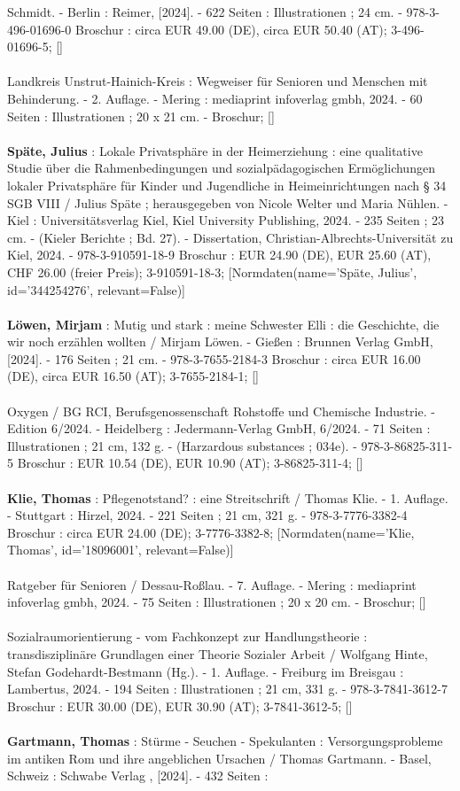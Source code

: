 \documentclass{article}
\begin{document}
\begin{multicols}{3}
Schmidt. - Berlin : Reimer, [2024]. - 622 Seiten : Illustrationen ; 24 cm. - 978-3-496-01696-0 Broschur : circa EUR 49.00 (DE), circa EUR 50.40 (AT); 3-496-01696-5; []\\\\Landkreis Unstrut-Hainich-Kreis : Wegweiser für Senioren und Menschen mit Behinderung. - 2. Auflage. - Mering : mediaprint infoverlag gmbh, 2024. - 60 Seiten : Illustrationen ; 20 x 21 cm. - Broschur; []\\\\\textbf{Späte, Julius} : Lokale Privatsphäre in der Heimerziehung : eine qualitative Studie über die Rahmenbedingungen und sozialpädagogischen Ermöglichungen lokaler Privatsphäre für Kinder und Jugendliche in Heimeinrichtungen nach § 34 SGB VIII / Julius Späte ; herausgegeben von Nicole Welter und Maria Nühlen. - Kiel : Universitätsverlag Kiel, Kiel University Publishing, 2024. - 235 Seiten ; 23 cm. - (Kieler Berichte ; Bd. 27). - Dissertation, Christian-Albrechts-Universität zu Kiel, 2024. - 978-3-910591-18-9 Broschur : EUR 24.90 (DE), EUR 25.60 (AT), CHF 26.00 (freier Preis); 3-910591-18-3; [Normdaten(name='Späte, Julius', id='344254276', relevant=False)]\\\\\textbf{Löwen, Mirjam} : Mutig und stark : meine Schwester Elli : die Geschichte, die wir noch erzählen wollten / Mirjam Löwen. - Gießen : Brunnen Verlag GmbH, [2024]. - 176 Seiten ; 21 cm. - 978-3-7655-2184-3 Broschur : circa EUR 16.00 (DE), circa EUR 16.50 (AT); 3-7655-2184-1; []\\\\Oxygen / BG RCI, Berufsgenossenschaft Rohstoffe und Chemische Industrie. - Edition 6/2024. - Heidelberg : Jedermann-Verlag GmbH, 6/2024. - 71 Seiten : Illustrationen ; 21 cm, 132 g. - (Harzardous substances ; 034e). - 978-3-86825-311-5 Broschur : EUR 10.54 (DE), EUR 10.90 (AT); 3-86825-311-4; []\\\\\textbf{Klie, Thomas} : Pflegenotstand? : eine Streitschrift / Thomas Klie. - 1. Auflage. - Stuttgart : Hirzel, 2024. - 221 Seiten ; 21 cm, 321 g. - 978-3-7776-3382-4 Broschur : circa EUR 24.00 (DE); 3-7776-3382-8; [Normdaten(name='Klie, Thomas', id='18096001', relevant=False)]\\\\Ratgeber für Senioren / Dessau-Roßlau. - 7. Auflage. - Mering : mediaprint infoverlag gmbh, 2024. - 75 Seiten : Illustrationen ; 20 x 20 cm. - Broschur; []\\\\Sozialraumorientierung - vom Fachkonzept zur Handlungstheorie : transdisziplinäre Grundlagen einer Theorie Sozialer Arbeit / Wolfgang Hinte, Stefan Godehardt-Bestmann (Hg.). - 1. Auflage. - Freiburg im Breisgau : Lambertus, 2024. - 194 Seiten : Illustrationen ; 21 cm, 331 g. - 978-3-7841-3612-7 Broschur : EUR 30.00 (DE), EUR 30.90 (AT); 3-7841-3612-5; []\\\\\textbf{Gartmann, Thomas} : Stürme - Seuchen - Spekulanten : Versorgungsprobleme im antiken Rom und ihre angeblichen Ursachen / Thomas Gartmann. - Basel, Schweiz : Schwabe Verlag , [2024]. - 432 Seiten : 
\end{multicols}
\end{document}

